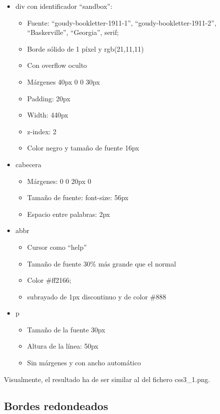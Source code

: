 \begin{itemize}
  \item div con identificador ``sandbox'':
  \begin{itemize}
    \item Fuente: ``goudy-bookletter-1911-1'', ``goudy-bookletter-1911-2'', ``Baskerville'', ``Georgia'', serif;
    \item Borde sólido de 1 píxel y rgb(21,11,11)
    \item Con overflow oculto
    \item Márgenes 40px 0 0 30px
    \item Padding: 20px
    \item Width: 440px
    \item z-index: 2
    \item Color negro y tamaño de fuente 16px
  \end{itemize}
  \item cabecera
  \begin{itemize}
    \item Márgenes: 0 0 20px 0
    \item Tamaño de fuente: font-size: 56px
    \item Espacio entre palabras: 2px
  \end{itemize}
  \item abbr
  \begin{itemize}
    \item Cursor como ``help''
    \item Tamaño de fuente 30\% más grande que el normal
    \item Color \#ff2166;
    \item subrayado de 1px discontinuo y de color \#888
  \end{itemize}
  \item p
  \begin{itemize}
    \item Tamaño de la fuente 30px
    \item Altura de la línea: 50px
    \item Sin márgenes y con ancho automático
  \end{itemize}
\end{itemize}

Visualmente, el resultado ha de ser similar al del fichero css3\_1.png.

\subsection{Bordes redondeados}
\label{subsec:bordes-redondeados}

